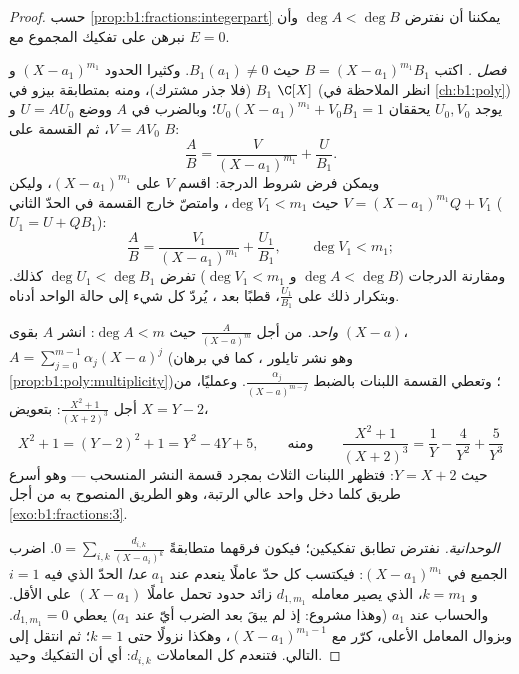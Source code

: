 \begin{proof}
حسب \cref{prop:b1:fractions:integerpart} يمكننا أن نفترض $\deg A < \deg
B$ وأن نبرهن على تفكيك المجموع مع $E = 0$.

\emph{فصل .} اكتب $B = (X - a_1)^{m_1} B_1$ حيث
$B_1(a_1) \neq 0$. وكثيرا الحدود $(X-a_1)^{m_1}$ و $B_1$
 (فلا جذر مشترك)، ومنه بمتطابقة بيزو في $\C[X]$ (انظر الملاحظة في
\cref{ch:b1:poly}) يوجد $U_0, V_0$ يحققان $U_0 (X-a_1)^{m_1} +
V_0 B_1 = 1$؛ وبالضرب في $A$ ووضع $U = AU_0$ و$V =
AV_0$، ثم القسمة على $B$:
\[
\frac AB = \frac{V}{(X - a_1)^{m_1}} + \frac{U}{B_1} .
\]
ويمكن فرض شروط الدرجة: اقسم $V$ على
$(X-a_1)^{m_1}$، وليكن $V = (X-a_1)^{m_1}Q + V_1$ حيث $\deg V_1 <
m_1$، وامتصّ خارج القسمة في الحدّ الثاني ($U_1 = U +
QB_1$):
\[
\frac AB = \frac{V_1}{(X - a_1)^{m_1}} + \frac{U_1}{B_1},
\qquad \deg V_1 < m_1 ;
\]
ومقارنة الدرجات ($\deg A < \deg B$ و $\deg V_1 < m_1$) تفرض
$\deg U_1 < \deg B_1$ كذلك. وبتكرار ذلك على $\frac{U_1}{B_1}$،
قطبًا بعد ، يُردّ كل شيء إلى حالة  الواحد أدناه.

\emph{ واحد.} من أجل $\frac{A}{(X-a)^m}$ حيث $\deg A < m$: انشر $A$
بقوى $(X - a)$، $A = \sum_{j=0}^{m-1} \alpha_j (X - a)^j$
(وهو نشر تايلور ، كما في برهان
\cref{prop:b1:poly:multiplicity})؛ وتعطي القسمة اللبنات بالضبط
$\frac{\alpha_j}{(X-a)^{m-j}}$. وعمليًا، من أجل $\frac{X^2 +
1}{(X+2)^3}$: بتعويض $X = Y - 2$،
\[
X^2 + 1 = (Y - 2)^2 + 1 = Y^2 - 4Y + 5 ,
\qquad\text{ومنه}\qquad
\frac{X^2+1}{(X+2)^3} = \frac1{Y} - \frac4{Y^2} + \frac5{Y^3}
\]
حيث $Y = X + 2$: فتظهر اللبنات الثلاث بمجرد قسمة
النشر المنسحب --- وهو أسرع طريق كلما دخل  واحد
عالي الرتبة، وهو الطريق المنصوح به من أجل
\cref{exo:b1:fractions:3}.

\emph{الوحدانية.} نفترض تطابق تفكيكين؛ فيكون
فرقهما متطابقةً $0 = \sum_{i,k} \frac{d_{i,k}}{(X -
a_i)^k}$. اضرب الجميع في $(X - a_1)^{m_1}$: فيكتسب كل حدّ
عاملًا ينعدم عند $a_1$ \emph{عدا} الحدّ الذي فيه
$i = 1$ و $k = m_1$، الذي يصير معامله $d_{1,m_1}$ زائد
حدود تحمل عاملًا $(X - a_1)$ على الأقل. والحساب عند
$a_1$ (وهذا مشروع: إذ لم يبقَ بعد الضرب أيّ  عند
$a_1$) يعطي $d_{1,m_1} = 0$. وبزوال المعامل الأعلى،
كرّر مع $(X - a_1)^{m_1 - 1}$، وهكذا نزولًا حتى $k = 1$؛
ثم انتقل إلى  التالي. فتنعدم كل المعاملات $d_{i,k}$: أي أن
التفكيك وحيد.
\end{proof}

